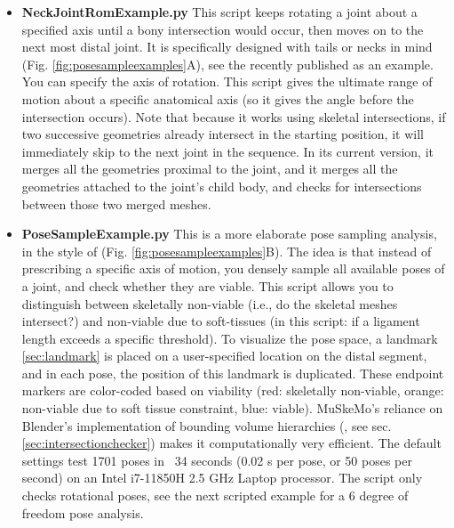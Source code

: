 \documentclass{article}
\begin{document}
\begin{itemize}
    \item \textbf{NeckJointRomExample.py} This script keeps rotating a joint about a specified axis until a bony intersection would occur, then moves on to the next most distal joint. It is specifically designed with tails or necks in mind (Fig. \ref{fig:posesampleexamples}A), see the recently published \cite{diezdiazCentresRotationOsteological2025} as an example. You can specify the axis of rotation. This script gives the ultimate range of motion about a specific anatomical axis (so it gives the angle before the intersection occurs). Note that because it works using skeletal intersections, if two successive geometries already intersect in the starting position, it will immediately skip to the next joint in the sequence. In its current version, it merges all the geometries proximal to the joint, and it merges all the geometries attached to the joint's child body, and checks for intersections between those two merged meshes.
    \item \textbf{PoseSampleExample.py} This is a more elaborate pose sampling analysis, in the style of \cite{manafzadehROMMappingLigamentous2018} (Fig. \ref{fig:posesampleexamples}B). The idea is that instead of prescribing a specific axis of motion, you densely sample all available poses of a joint, and check whether they are viable. This script allows you to distinguish between skeletally non-viable (i.e., do the skeletal meshes intersect?) and non-viable due to soft-tissues (in this script: if a ligament length exceeds a specific threshold). To visualize the pose space, a landmark \ref{sec:landmark} is placed on a user-specified location on the distal segment, and in each pose, the position of this landmark is duplicated. These endpoint markers are color-coded based on viability (red: skeletally non-viable, orange: non-viable due to soft tissue constraint, blue: viable). 
    MuSkeMo's reliance on Blender's implementation of bounding volume hierarchies (\cite{ericsonBoundingVolumeHierarchies2005}, see sec. \ref{sec:intersectionchecker}) makes it computationally very efficient. The default settings test 1701 poses in ~34 seconds (0.02 s per pose, or 50 poses per second) on an Intel i7-11850H 2.5 GHz Laptop processor.
    The script only checks rotational poses, see the next scripted example for a 6 degree of freedom pose analysis.

\end{itemize}
\end{document}

